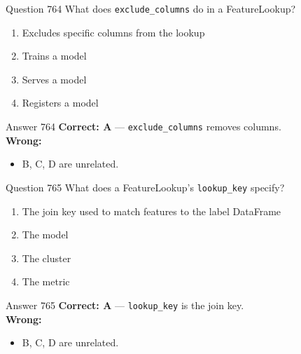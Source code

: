 \documentclass[aspectratio=169,11pt]{beamer}
\begin{document}
	\begin{frame}{Question 764}
		What does \texttt{exclude\_columns} do in a FeatureLookup?
		\begin{enumerate}[label=\Alph*.]
			\item Excludes specific columns from the lookup
			\item Trains a model
			\item Serves a model
			\item Registers a model
		\end{enumerate}
	\end{frame}
	\begin{frame}{Answer 764}
		\textbf{Correct: A} --- \texttt{exclude\_columns} removes columns.\\
		\vspace{0.5em}
		\textbf{Wrong:}
		\begin{itemize}
			\item B, C, D are unrelated.
		\end{itemize}
	\end{frame}
	
	\begin{frame}{Question 765}
		What does a FeatureLookup's \texttt{lookup\_key} specify?
		\begin{enumerate}[label=\Alph*.]
			\item The join key used to match features to the label DataFrame
			\item The model
			\item The cluster
			\item The metric
		\end{enumerate}
	\end{frame}
	\begin{frame}{Answer 765}
		\textbf{Correct: A} --- \texttt{lookup\_key} is the join key.\\
		\vspace{0.5em}
		\textbf{Wrong:}
		\begin{itemize}
			\item B, C, D are unrelated.
		\end{itemize}
	\end{frame}
	
\end{document}
